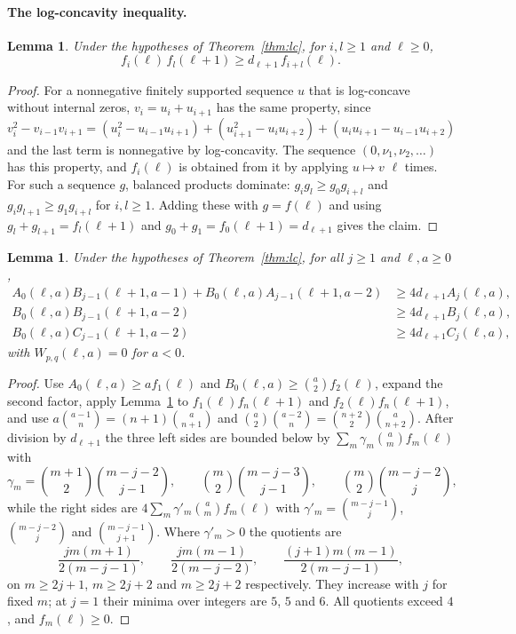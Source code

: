 \documentclass[twoside,10pt]{article}
\numberwithin{equation}{section}
\theoremstyle{slbody}
\newtheorem{lemma}[theorem]{Lemma}
\theoremstyle{definition}
\theoremstyle{remark}
\begin{document}
\paragraph{The log-concavity inequality.}
\begin{lemma}\label{lem:lc-ineq}
Under the hypotheses of Theorem~\ref{thm:lc}, for $i,l\geq1$ and $\ell\geq0$,
\[
f_i(\ell)\,f_l(\ell+1)\geq d_{\ell+1}\,f_{i+l}(\ell).
\]
\end{lemma}
\begin{proof}
For a nonnegative finitely supported sequence $u$ that is log-concave without internal zeros, $v_i=u_i+u_{i+1}$ has the same property, since
$v_i^2-v_{i-1}v_{i+1}=(u_i^2-u_{i-1}u_{i+1})+(u_{i+1}^2-u_iu_{i+2})+(u_iu_{i+1}-u_{i-1}u_{i+2})$
and the last term is nonnegative by log-concavity. The sequence $(0,\nu_1,\nu_2,\ldots)$ has this property, and $f_i(\ell)$ is obtained from it by applying $u\mapsto v$ $\ell$ times. For such a sequence $g$, balanced products dominate: $g_ig_l\geq g_0g_{i+l}$ and $g_ig_{l+1}\geq g_1g_{i+l}$ for $i,l\geq1$. Adding these with $g=f(\ell)$ and using $g_l+g_{l+1}=f_l(\ell+1)$ and $g_0+g_1=f_0(\ell+1)=d_{\ell+1}$ gives the claim.
\end{proof}

\begin{lemma}\label{lem:detours}
Under the hypotheses of Theorem~\ref{thm:lc}, for all $j\geq1$ and $\ell,a\geq0$,
\[
\begin{aligned}
A_0(\ell,a)B_{j-1}(\ell+1,a-1)+B_0(\ell,a)A_{j-1}(\ell+1,a-2)&\geq4d_{\ell+1}A_j(\ell,a),\\
B_0(\ell,a)B_{j-1}(\ell+1,a-2)&\geq4d_{\ell+1}B_j(\ell,a),\\
B_0(\ell,a)C_{j-1}(\ell+1,a-2)&\geq4d_{\ell+1}C_j(\ell,a),
\end{aligned}
\]
with $W_{p,q}(\ell,a)=0$ for $a<0$.
\end{lemma}
\begin{proof}
Use $A_0(\ell,a)\geq af_1(\ell)$ and $B_0(\ell,a)\geq\binom a2f_2(\ell)$, expand the second factor, apply Lemma~\ref{lem:lc-ineq} to $f_1(\ell)f_n(\ell+1)$ and $f_2(\ell)f_n(\ell+1)$, and use $a\binom{a-1}n=(n+1)\binom a{n+1}$ and $\binom a2\binom{a-2}n=\binom{n+2}2\binom a{n+2}$. After division by $d_{\ell+1}$ the three left sides are bounded below by $\sum_m\gamma_m\binom amf_m(\ell)$ with
\[
\gamma_m=\binom{m+1}2\binom{m-j-2}{j-1},\qquad\binom m2\binom{m-j-3}{j-1},\qquad\binom m2\binom{m-j-2}j,
\]
while the right sides are $4\sum_m\gamma'_m\binom amf_m(\ell)$ with $\gamma'_m=\binom{m-j-1}j$, $\binom{m-j-2}j$ and $\binom{m-j-1}{j+1}$. Where $\gamma'_m>0$ the quotients are
\[
\frac{jm(m+1)}{2(m-j-1)},\qquad\frac{jm(m-1)}{2(m-j-2)},\qquad\frac{(j+1)m(m-1)}{2(m-j-1)},
\]
on $m\geq2j+1$, $m\geq2j+2$ and $m\geq2j+2$ respectively. They increase with $j$ for fixed $m$; at $j=1$ their minima over integers are $5$, $5$ and $6$. All quotients exceed $4$, and $f_m(\ell)\geq0$.
\end{proof}
\end{document}
